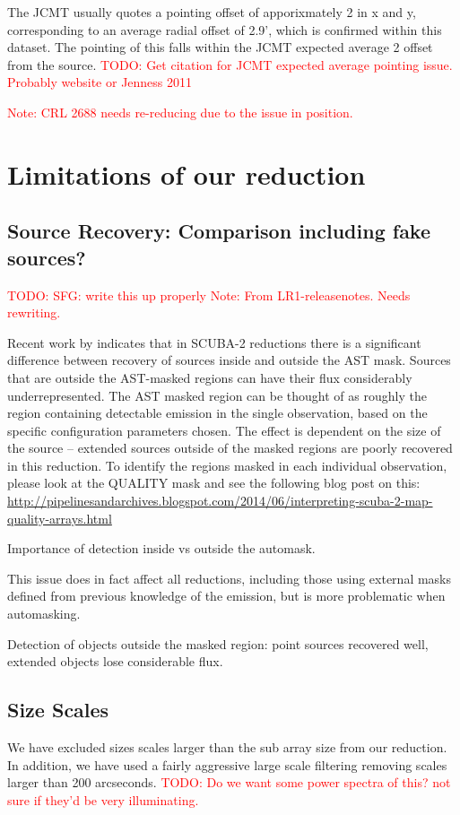 \documentclass[twocolumn]{aastex6}
\newcommand{\todo}[1]{\textcolor{red}{TODO: #1}}
\newcommand{\note}[1]{\textcolor{red}{Note: #1}}
\begin{document}
The JCMT usually quotes a pointing offset of apporixmately 2\arcsec{}
in x and y, corresponding to an average radial offset of
2.9'\arcsec{}, which is confirmed within this dataset.
The pointing of this falls within the JCMT expected average 2\arcsec{} offset
from the source. \todo{Get citation for JCMT expected average pointing
  issue. Probably website or Jenness 2011}

\note{CRL 2688 needs re-reducing due to the issue in position.}



\section{Limitations of our reduction}


\subsection{Source Recovery: Comparison including fake sources?}
\todo{SFG: write this up properly}
\note{From LR1-releasenotes. Needs rewriting.}

Recent work by \citet{Mairs2015} indicates that
in SCUBA-2 reductions there is a significant difference between
recovery of sources inside and outside the AST mask. Sources that are
outside the AST-masked regions can have their flux considerably
underrepresented. The AST masked region can be thought of as roughly
the region containing detectable emission in the single observation,
based on the specific configuration parameters chosen. The effect is
dependent on the size of the source -- extended sources outside of the
masked regions are poorly recovered in this reduction. To identify the
regions masked in each individual observation, please look at the
QUALITY mask and see the following blog post on this:
\url{http://pipelinesandarchives.blogspot.com/2014/06/interpreting-scuba-2-map-quality-arrays.html}

Importance of detection inside vs outside the automask.

This issue does in fact affect all reductions, including those using
external masks defined from previous knowledge of the emission, but
is more problematic when automasking.

Detection of objects outside the masked region: point sources
recovered well, extended objects lose considerable flux.


\subsection{Size Scales}
We have excluded sizes scales larger than the sub array size from our
reduction. In addition, we have used a fairly aggressive large scale
filtering removing scales larger than 200 arcseconds.
\todo{Do we want some power spectra of this? not sure if they'd be very illuminating.}
\end{document}
